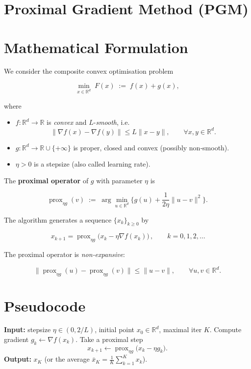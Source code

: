\documentclass{article}
\newcommand{\prox}{\operatorname{prox}}
\newcommand{\R}{\mathbb{R}}
\begin{document}
\section*{Proximal Gradient Method (PGM)}

\section*{Mathematical Formulation}
We consider the composite convex optimisation problem  

\[
\min_{x\in\R^{d}} \; F(x)\;:=\;f(x)+g(x),
\]

where  

\begin{itemize}
  \item $f:\R^{d}\rightarrow\R$ is \emph{convex} and $L$-\emph{smooth}, i.e.  
        \[
        \|\nabla f(x)-\nabla f(y)\|\le L\|x-y\|,\qquad\forall x,y\in\R^{d}.
        \]
  \item $g:\R^{d}\rightarrow\R\cup\{+\infty\}$ is proper, closed and convex (possibly non‑smooth).  
  \item $\eta>0$ is a stepsize (also called learning rate).  
\end{itemize}

The \textbf{proximal operator} of $g$ with parameter $\eta$ is  

\[
\prox_{\eta g}(v)\;:=\;\arg\min_{u\in\R^{d}}\Big\{g(u)+\frac{1}{2\eta}\|u-v\|^{2}\Big\}.
\]

The algorithm generates a sequence $\{x_{k}\}_{k\ge0}$ by  

\[
\boxed{\,x_{k+1}= \prox_{\eta g}\!\bigl(x_{k}-\eta\nabla f(x_{k})\bigr)\,},\qquad k=0,1,2,\dots
\tag{1}
\]

The proximal operator is \emph{non‑expansive}:  

\[
\|\prox_{\eta g}(u)-\prox_{\eta g}(v)\|\le\|u-v\|,\qquad\forall u,v\in\R^{d}. \tag{2}
\]

\section*{Pseudocode}
\begin{algorithm}[H]
\caption{Proximal Gradient Method}
\begin{algorithmic}[1]
\STATE \textbf{Input:} stepsize $\eta\in(0,2/L)$, initial point $x_{0}\in\R^{d}$, maximal iter $K$.
    \STATE Compute gradient $g_{k}\gets\nabla f(x_{k})$.
    \STATE Take a proximal step 
    \[
    x_{k+1}\gets\prox_{\eta g}\bigl(x_{k}-\eta g_{k}\bigr).
    \]
\ENDFOR
\STATE \textbf{Output:} $x_{K}$ (or the average $\bar x_{K}=\frac1K\sum_{k=1}^{K}x_{k}$).
\end{algorithmic}
\end{algorithm}
\end{document}
